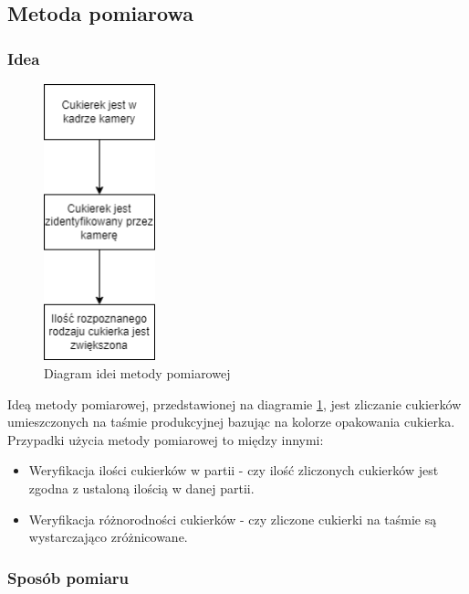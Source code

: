 \documentclass{article}
\begin{document}
\subsection{Metoda pomiarowa}
\label{Metoda pomiarowa}
\subsubsection{Idea}
\label{Idea}

\begin{figure}[H]
    \centering
    \includegraphics[height=8cm]{diagram_idei.png}
    \caption{Diagram idei metody pomiarowej}
    \label{fig:diagramIdei}
\end{figure}

Ideą metody pomiarowej, przedstawionej na diagramie \ref{fig:diagramIdei}, jest zliczanie cukierków umieszczonych na taśmie produkcyjnej bazując na kolorze opakowania cukierka. Przypadki użycia metody pomiarowej to między innymi:

\begin{itemize}
    \item Weryfikacja ilości cukierków w partii - czy ilość zliczonych cukierków jest zgodna z ustaloną ilością w danej partii.
    \item Weryfikacja różnorodności cukierków - czy zliczone cukierki na taśmie są wystarczająco zróżnicowane.
\end{itemize}

\subsubsection{Sposób pomiaru}
\label{Sposób pomiaru}
\end{document}
